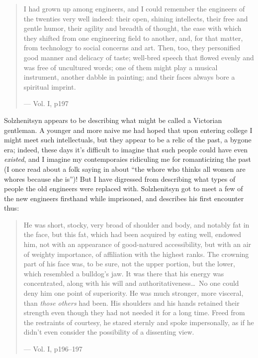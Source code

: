 \documentclass{article}
\begin{document}
\begin{quote}
I had grown up among engineers, and I could remember the engineers of the twenties very well indeed: their open, shining intellects, their free and gentle humor, their agility and breadth of thought, the ease with which they shifted from one engineering field to another, and, for that matter, from technology to social concerns and art.  Then, too, they personified good manner and delicacy of taste; well-bred speech that flowed evenly and was free of uncultured words; one of them might play a musical instrument, another dabble in painting; and their faces always bore a spiritual imprint.

--- Vol. I, p197
\end{quote}

Solzhenitsyn appears to be describing what might be called a Victorian gentleman.  A younger and more naive me had hoped that upon entering college I might meet such intellectuals, but they appear to be a relic of the past, a bygone era; indeed, these days it's difficult to imagine that such people could have even \emph{existed}, and I imagine my contemporaies ridiculing me for romanticizing the past (I once read about a folk saying in  about ``the whore who thinks all women are whores because she is'')!  But I have digressed from describing what types of people the old engineers were replaced with.  Solzhenitsyn got to meet a few of the new engineers firsthand while imprisoned, and describes his first encounter thus:

\begin{quote}
He was short, stocky, very broad of shoulder and body, and notably fat in the face, but this fat, which had been acquired by eating well, endowed him, not with an appearance of good-natured accessibility, but with an air of weighty importance, of affiliation with the highest ranks.  The crowning part of his face was, to be sure, not the upper portion, but the lower, which resembled a bulldog's jaw.  It was there that his energy was concentrated, along with his will and authoritativeness\ldots~No one could deny him one point of superiority.  He was much stronger, more visceral, than \emph{those others} had been.  His shoulders and his hands retained their strength even though they had not needed it for a long time.  Freed from the restraints of courtesy, he stared sternly and spoke impersonally, as if he didn't even consider the possibility of a dissenting view.

--- Vol. I, p196--197
\end{quote}
\end{document}
